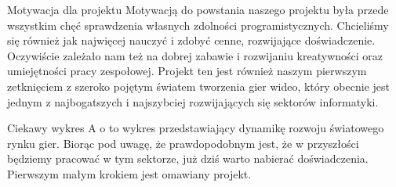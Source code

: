\documentclass{beamer}
\begin{document}
\begin{frame}{Motywacja dla projektu}
Motywacją do powstania naszego projektu była przede wszystkim chęć sprawdzenia własnych zdolności programistycznych.
Chcieliśmy się również jak najwięcej nauczyć i zdobyć cenne, rozwijające doświadczenie.
Oczywiście zależało nam też na dobrej zabawie i rozwijaniu kreatywności oraz umiejętności pracy zespołowej.
Projekt ten jest również naszym pierwszym zetknięciem z szeroko pojętym światem tworzenia gier wideo, który obecnie jest jednym z najbogatszych i najszybciej rozwijających się sektorów informatyki.

\end{frame}

\begin{frame}{Ciekawy wykres}
A o to wykres przedstawiający dynamikę rozwoju światowego rynku gier.
Biorąc pod uwagę, że prawdopodobnym jest, że w przyszłości będziemy pracować w tym sektorze, już dziś warto nabierać doświadczenia.
Pierwszym małym krokiem jest omawiany projekt.


\end{frame}
\end{document}
